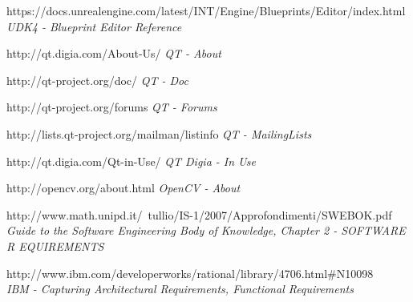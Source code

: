 \documentclass[a4paper,12pt,oneside]{report}
\begin{document}
\begin{thebibliography}{99}
		https://docs.unrealengine.com/latest/INT/Engine/Blueprints/Editor/index.html\\
        {\em UDK4 - Blueprint Editor Reference}  


		http://qt.digia.com/About-Us/
        {\em QT - About } 
 
        http://qt-project.org/doc/
        {\em QT - Doc} 
         
        http://qt-project.org/forums
        {\em QT - Forums}        

          http://lists.qt-project.org/mailman/listinfo 
        {\em QT - MailingLists}        


        http://qt.digia.com/Qt-in-Use/
        {\em QT Digia - In Use}  
        
        
        http://opencv.org/about.html
        {\em OpenCV - About}  
        
        
        http://www.math.unipd.it/~tullio/IS-1/2007/Approfondimenti/SWEBOK.pdf\\
        {\em Guide to the Software Engineering Body of Knowledge, Chapter 2 - SOFTWARE R EQUIREMENTS}
        
        
		http://www.ibm.com/developerworks/rational/library/4706.html\#N10098 \\
        {\em IBM - Capturing Architectural Requirements, Functional Requirements }
        

        



\end{thebibliography}
\end{document}
